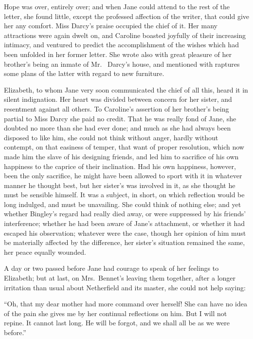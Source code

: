 Hope was over, entirely over; and when Jane could attend to the
rest of the letter, she found little, except the professed affection
of the writer, that could give her any comfort.  Miss Darcy's
praise occupied the chief of it.  Her many attractions were again
dwelt on, and Caroline boasted joyfully of their increasing
intimacy, and ventured to predict the accomplishment of the
wishes which had been unfolded in her former letter.  She wrote
also with great pleasure of her brother's being an inmate of Mr.\ %
Darcy's house, and mentioned with raptures some plans of the
latter with regard to new furniture.

Elizabeth, to whom Jane very soon communicated the chief of
all this, heard it in silent indignation.  Her heart was divided
between concern for her sister, and resentment against all others.
To Caroline's assertion of her brother's being partial to Miss
Darcy she paid no credit.  That he was really fond of Jane, she
doubted no more than she had ever done; and much as she had
always been disposed to like him, she could not think without
anger, hardly without contempt, on that easiness of temper, that
want of proper resolution, which now made him the slave of his
designing friends, and led him to sacrifice of his own happiness
to the caprice of their inclination.  Had his own happiness,
however, been the only sacrifice, he might have been allowed to
sport with it in whatever manner he thought best, but her sister's
was involved in it, as she thought he must be sensible himself.
It was a subject, in short, on which reflection would be long
indulged, and must be unavailing.  She could think of nothing
else; and yet whether Bingley's regard had really died away, or
were suppressed by his friends' interference; whether he had
been aware of Jane's attachment, or whether it had escaped his
observation; whatever were the case, though her opinion of him
must be materially affected by the difference, her sister's
situation remained the same, her peace equally wounded.

A day or two passed before Jane had courage to speak of her
feelings to Elizabeth; but at last, on Mrs.\ Bennet's leaving them
together, after a longer irritation than usual about Netherfield
and its master, she could not help saying:

``Oh, that my dear mother had more command over herself!  She
can have no idea of the pain she gives me by her continual
reflections on him.  But I will not repine.  It cannot last long.
He will be forgot, and we shall all be as we were before.''

